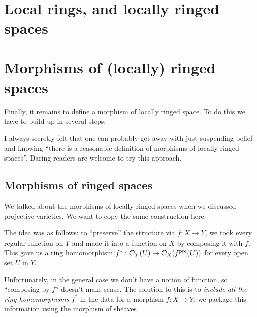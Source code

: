 \section{Local rings, and locally ringed spaces}

\section{Morphisms of (locally) ringed spaces}
Finally, it remains to define a morphism of locally ringed space.
To do this we have to build up in several steps.

\begin{remark}
	I always secretly felt that one can probably get away with just
	suspending belief and knowing ``there is a reasonable definition
	of morphisms of locally ringed spaces''.
	Daring readers are welcome to try this approach.
\end{remark}

\subsection{Morphisms of ringed spaces}
We talked about the morphisms of locally ringed spaces
when we discussed projective varieties.
We want to copy the same construction here.

The idea was as follows: to ``preserve'' the structure via $f : X \to Y$,
we took every regular function on $Y$ and made it into a function on $X$
by composing it with $f$.
This gave us a ring homomorphism $f^\ast : \mathcal O_Y(U) \to \mathcal O_X(f^{\text{pre}}(U))$
for every open set $U$ in $Y$.

Unfortunately, in the general case we don't have a notion of function,
so ``composing by $f$'' doesn't make sense.
The solution to this is to \emph{include all the ring homomorphisms $f^\ast$}
in the data for a morphism $f : X \to Y$;
we package this information using the morphism of sheaves.

